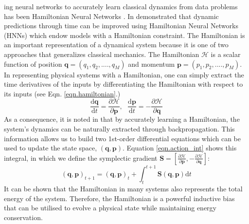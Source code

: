 \documentclass{article}
\begin{document}
ing neural networks to accurately learn classical dynamics from data  problems has been Hamiltonian Neural Networks \cite{greydanus_hamiltonian_2019}. In  demonstrated that dynamic predictions through time can be improved using Hamiltonian Neural Networks (HNNs) which endow models with a Hamiltonian constraint. The Hamiltonian is an important representation of a dynamical system because it is one of two approaches that generalizes classical mechanics. The Hamiltonian $\mathcal{H}$ is a scalar function of position $\mathbf{q} = (q_1,q_2,....,q_M)$ and momentum $\mathbf{p} = (p_1,p_2,....,p_M)$. In representing physical systems with a Hamiltonian, one can simply extract the time derivatives of the inputs by differentiating the Hamiltonian with respect to its inputs (see Eqn. \ref{eqn.hamiltonian}.)
\begin{equation}
\frac{\mathrm{d}\mathbf{q}}{\mathrm{d}t} = \frac{\partial \mathcal{H}}{\partial \mathbf{p}}, ~~~
\frac{\mathrm{d}\mathbf{p}}{\mathrm{d}t} = -\frac{\partial \mathcal{H}}{\partial \mathbf{q}}
\label{eqn.hamiltonian}
\end{equation}
As a consequence, it is noted in \cite{greydanus_hamiltonian_2019} that by accurately learning a Hamiltonian, the system's dynamics can be naturally extracted through backpropagation. This information allows us to build two 1st-order differential equations which can be used to update the state space, $(\mathbf{q},\mathbf{p})$. Equation \ref{eqn.action_int} shows this integral, in which we define the symplectic gradient $\mathbf{S}  = \left [ \frac{\partial \mathcal{H}}{\partial \mathbf{p}},-\frac{\partial \mathcal{H}}{\partial \mathbf{q}} \right ] $:
\begin{equation}
(\mathbf{q},\mathbf{p})_{t+1} = (\mathbf{q},\mathbf{p})_t + \int_t^{t+1} \mathbf{S}(\mathbf{q},\mathbf{p}) \mathrm{d}t
\label{eqn.action_int}
\end{equation}
It can be shown that the Hamiltonian in many systems also represents the total energy of the system. Therefore, the Hamiltonian is a powerful inductive bias that can be utilised to evolve a physical state while maintaining energy conservation.
\end{document}
